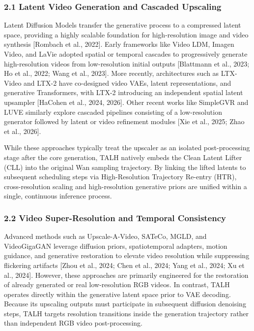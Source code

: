 \hypertarget{latent-video-generation-and-cascaded-upscaling}{%
\subsubsection{2.1 Latent Video Generation and Cascaded Upscaling}\label{latent-video-generation-and-cascaded-upscaling}}

Latent Diffusion Models transfer the generative process to a compressed latent space, providing a highly scalable foundation for high-resolution image and video synthesis {[}Rombach et al., 2022{]}. Early frameworks like Video LDM, Imagen Video, and LaVie adopted spatial or temporal cascades to progressively generate high-resolution videos from low-resolution initial outputs {[}Blattmann et al., 2023; Ho et al., 2022; Wang et al., 2023{]}. More recently, architectures such as LTX-Video and LTX-2 have co-designed video VAEs, latent representations, and generative Transformers, with LTX-2 introducing an independent spatial latent upsampler {[}HaCohen et al., 2024, 2026{]}. Other recent works like SimpleGVR and LUVE similarly explore cascaded pipelines consisting of a low-resolution generator followed by latent or video refinement modules {[}Xie et al., 2025; Zhao et al., 2026{]}.

While these approaches typically treat the upscaler as an isolated post-processing stage after the core generation, TALH natively embeds the Clean Latent Lifter (CLL) into the original Wan sampling trajectory. By linking the lifted latents to subsequent scheduling steps via High-Resolution Trajectory Re-entry (HTR), cross-resolution scaling and high-resolution generative priors are unified within a single, continuous inference process.

\hypertarget{video-super-resolution-and-temporal-consistency}{%
\subsubsection{2.2 Video Super-Resolution and Temporal Consistency}\label{video-super-resolution-and-temporal-consistency}}

Advanced methods such as Upscale-A-Video, SATeCo, MGLD, and VideoGigaGAN leverage diffusion priors, spatiotemporal adapters, motion guidance, and generative restoration to elevate video resolution while suppressing flickering artifacts {[}Zhou et al., 2024; Chen et al., 2024; Yang et al., 2024; Xu et al., 2024{]}. However, these approaches are primarily engineered for the restoration of already generated or real low-resolution RGB videos. In contrast, TALH operates directly within the generative latent space prior to VAE decoding. Because its upscaling outputs must participate in subsequent diffusion denoising steps, TALH targets resolution transitions inside the generation trajectory rather than independent RGB video post-processing.

